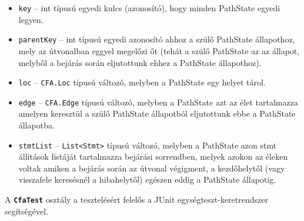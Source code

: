 \begin{itemize}
	\item \texttt{key} -- int típusú egyedi kulcs (azonosító), hogy minden PathState egyedi legyen.
	\item \texttt{parentKey} -- int típusú egyedi azonosító ahhoz a szülő PathState állapothoz, mely az útvonalban eggyel megelőzi őt (tehát a szülő PathState az az állapot, melyből a bejárás során eljutottunk ehhez a PathState állapothoz). %
	\item \texttt{loc} -- \texttt{CFA.Loc} típusú változó, melyben a PathState egy helyet tárol.
	\item \texttt{edge} -- \texttt{CFA.Edge} típusú változó, melyben a PathState azt az élet tartalmazza amelyen keresztül a szülő PathState állapotból eljutottunk ebbe a PathState állapotba.
	\item \texttt{stmtList} -- \texttt{List<Stmt>} típusú változó, melyben a PathState azon stmt állítások listáját tartalmazza bejárási sorrendben, melyek azokon az éleken voltak amiken a bejárás során az útvonal végigment, a kezdőhelytől (vagy visszafele keresésnél a hibahelytől) egészen eddig a PathState állapotig.
\end{itemize}
A \textbf{\texttt{CfaTest}} osztály a tesztelésért felelős a JUnit egységteszt-keretrendszer segítségével.

